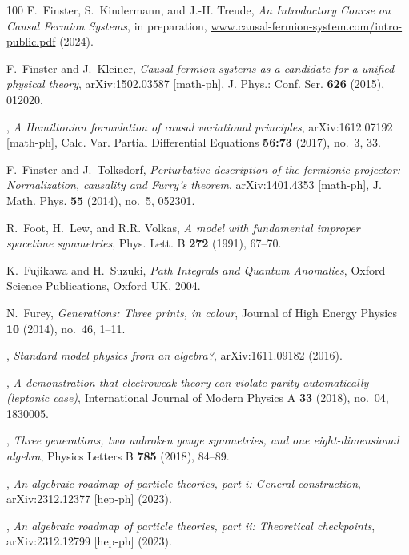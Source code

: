 \documentclass[reqno,11pt]{amsart}
\numberwithin{equation}{section}
\newcommand{\1}{\mbox{\rm 1 \hspace{-1.05 em} 1}}
\begin{document}
{\begin{thebibliography}{100}
F.~Finster, S.~Kindermann, and J.-H. Treude, \emph{An {I}ntroductory {C}ourse
  on {C}ausal {F}ermion {S}ystems}, in preparation,
  \href{https://causal-fermion-system.com/intro-public.pdf}{www.causal-fermion-system.com/intro-public.pdf}
  (2024).

F.~Finster and J.~Kleiner, \emph{Causal fermion systems as a candidate for a
  unified physical theory}, arXiv:1502.03587 [math-ph], J. Phys.: Conf. Ser.
  \textbf{626} (2015), 012020.

\bysame, \emph{A {H}amiltonian formulation of causal variational principles},
  arXiv:1612.07192 [math-ph], Calc. Var. Partial Differential Equations
  \textbf{56:73} (2017), no.~3, 33.

F.~Finster and J.~Tolksdorf, \emph{Perturbative description of the fermionic
  projector: {N}ormalization, causality and {F}urry's theorem}, arXiv:1401.4353
  [math-ph], J. Math. Phys. \textbf{55} (2014), no.~5, 052301.

R.~Foot, H.~Lew, and R.R. Volkas, \emph{A model with fundamental improper
  spacetime symmetries}, Phys. Lett. B \textbf{272} (1991), 67--70.

K.~Fujikawa and H.~Suzuki, \emph{{Path Integrals and Quantum Anomalies}},
  Oxford Science Publications, Oxford UK, 2004.

N.~Furey, \emph{Generations: {T}hree prints, in colour}, Journal of High Energy
  Physics \textbf{10} (2014), no.~46, 1--11.

\bysame, \emph{Standard model physics from an algebra?}, arXiv:1611.09182
  (2016).

\bysame, \emph{A demonstration that electroweak theory can violate parity
  automatically (leptonic case)}, International Journal of Modern Physics A
  \textbf{33} (2018), no.~04, 1830005.

\bysame, \emph{Three generations, two unbroken gauge symmetries, and one
  eight-dimensional algebra}, Physics Letters B \textbf{785} (2018), 84--89.

\bysame, \emph{An algebraic roadmap of particle theories, part i: {G}eneral
  construction}, arXiv:2312.12377 [hep-ph] (2023).

\bysame, \emph{An algebraic roadmap of particle theories, part ii:
  {T}heoretical checkpoints}, arXiv:2312.12799 [hep-ph] (2023).


\end{thebibliography}}
\end{document}
